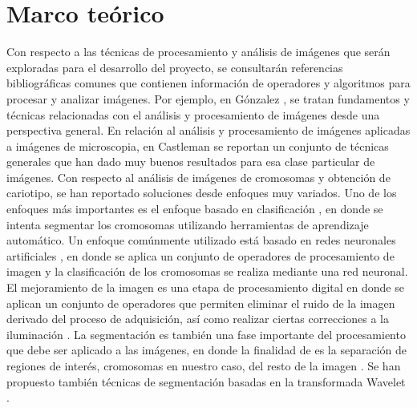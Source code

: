 \documentclass[12pt,letterpaper,titlepage]{article}
\begin{document}
\section{Marco teórico}\label{marco}
Con respecto a las técnicas de procesamiento y análisis de imágenes que serán exploradas para el desarrollo del proyecto, se consultarán referencias bibliográficas comunes que contienen información de operadores y algoritmos para procesar y analizar imágenes. Por ejemplo, en  Gónzalez \cite{1077}, se tratan fundamentos y técnicas relacionadas con el análisis y procesamiento de imágenes desde una perspectiva general. En relación al análisis y procesamiento de imágenes aplicadas a imágenes de microscopia, en Castleman \cite{1022} se reportan un conjunto de técnicas generales que han dado muy buenos resultados para esa clase particular de imágenes. Con respecto al análisis de imágenes de cromosomas y obtención de cariotipo, se han reportado soluciones desde enfoques muy variados. Uno de los enfoques más importantes es el enfoque basado en clasificación \cite{113}, en donde se intenta segmentar los cromosomas utilizando herramientas de aprendizaje automático. Un enfoque comúnmente utilizado está basado en redes neuronales artificiales \cite{104} \cite{111}, en donde se aplica un conjunto de operadores de procesamiento de imagen y la clasificación de los cromosomas se realiza mediante una red neuronal. El mejoramiento de la imagen es una etapa de procesamiento digital en donde se aplican un conjunto de operadores que permiten eliminar el ruido de la imagen derivado del proceso de adquisición, así como realizar ciertas correcciones a la iluminación \cite{114}. La segmentación es también una fase importante del procesamiento que debe ser aplicado a las imágenes, en donde la finalidad de es la separación de regiones de interés, cromosomas en nuestro caso, del resto de la imagen \cite{106} \cite{109} \cite{103} \cite{117} \cite{112}. Se han propuesto también técnicas de segmentación basadas en la transformada Wavelet \cite{116} \cite{115}. \\
\end{document}
